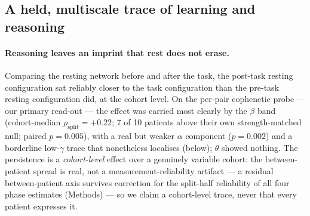 \documentclass[11pt]{article}
\begin{document}
\subsection{A held, multiscale trace of learning and reasoning}

\paragraph{Reasoning leaves an imprint that rest does not erase.}
Comparing the resting network before and after the task, the post-task resting
configuration sat reliably closer to the task configuration than the pre-task
resting configuration did, at the cohort level. On the per-pair cophenetic probe
--- our primary read-out --- the effect was carried most clearly by the $\beta$
band (cohort-median $\rho_{\text{split}}=+0.22$; 7 of 10 patients above their own
strength-matched null; paired $p=0.005$), with a real but weaker $\alpha$ component
($p=0.002$) and a borderline low-$\gamma$ trace that nonetheless localises (below);
$\theta$ showed nothing.
The persistence is a \emph{cohort-level} effect over a genuinely variable cohort:
the between-patient spread is real, not a measurement-reliability artifact --- a
residual between-patient axis survives correction for the split-half reliability of
all four phase estimates (Methods) --- so we claim a cohort-level trace, never that
every patient expresses it.
\end{document}

